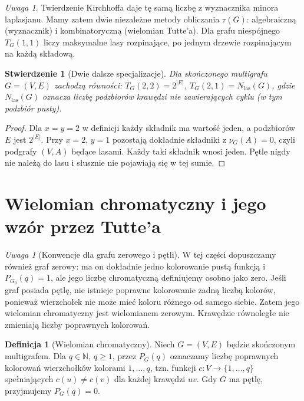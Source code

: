 \documentclass[11pt,a4paper]{report}
\numberwithin{equation}{section}
\theoremstyle{plain}
\newtheorem{stwierdzenie}[twierdzenie]{Stwierdzenie}
\theoremstyle{definition}
\newtheorem{definicja}[twierdzenie]{Definicja}
\theoremstyle{remark}
\newtheorem{uwaga}[twierdzenie]{Uwaga}
\begin{document}
\begin{uwaga}
Twierdzenie Kirchhoffa daje tę samą liczbę z wyznacznika
minora laplasjanu. Mamy zatem dwie niezależne metody
obliczania $\tau(G)$: algebraiczną (wyznacznik) i
kombinatoryczną (wielomian Tutte'a). Dla grafu niespójnego
$T_G(1,1)$ liczy maksymalne lasy rozpinające, po jednym
drzewie rozpinającym na każdą składową.
\end{uwaga}

\begin{stwierdzenie}[Dwie dalsze specjalizacje]
Dla skończonego multigrafu $G=(V,E)$ zachodzą równości:
$T_G(2,2)=2^{|E|}$,
$T_G(2,1)=N_{\mathrm{las}}(G)$,
gdzie $N_{\mathrm{las}}(G)$ oznacza liczbę podzbiorów
krawędzi nie zawierających cyklu (w tym podzbiór pusty).
\end{stwierdzenie}

\begin{proof}
Dla $x=y=2$ w definicji każdy składnik ma wartość jeden,
a podzbiorów $E$ jest $2^{|E|}$. Przy $x=2$, $y=1$
pozostają dokładnie składniki z $\nu_G(A)=0$, czyli
podgrafy $(V,A)$ będące lasami. Każdy taki składnik
wnosi jeden. Pętle nigdy nie należą do lasu i słusznie
nie pojawiają się w tej sumie.
\end{proof}

\section{Wielomian chromatyczny i jego wzór przez Tutte'a}
\label{sec:tg-chromatic}

\begin{uwaga}[Konwencje dla grafu zerowego i pętli]
W tej części dopuszczamy również graf zerowy: ma on dokładnie
jedno kolorowanie pustą funkcją i $P_{G_0}(q)=1$, ale jego
liczbę chromatyczną definiujemy osobno jako zero. Jeśli graf
posiada pętlę, nie istnieje poprawne kolorowanie żadną liczbą
kolorów, ponieważ wierzchołek nie może mieć koloru różnego
od samego siebie. Zatem jego wielomian chromatyczny jest
wielomianem zerowym. Krawędzie równoległe nie zmieniają
liczby poprawnych kolorowań.
\end{uwaga}

\begin{definicja}[Wielomian chromatyczny]
Niech $G=(V,E)$ będzie skończonym multigrafem.
Dla $q\in\mathbb N$, $q\ge1$, przez $P_G(q)$ oznaczamy
liczbę poprawnych kolorowań wierzchołków kolorami
$1,\ldots,q$, tzn. funkcji $c:V\to\{1,\ldots,q\}$
spełniających $c(u)\ne c(v)$ dla każdej krawędzi $uv$.
Gdy $G$ ma pętlę, przyjmujemy $P_G(q)=0$.
\end{definicja}
\end{document}
